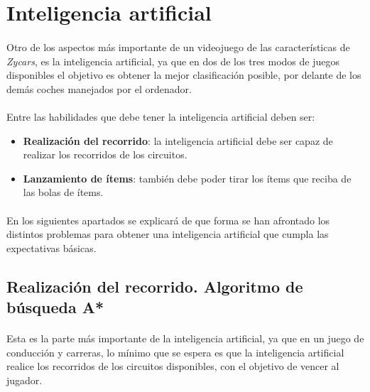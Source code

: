 \section{Inteligencia artificial}

\paragraph{}
Otro de los aspectos más importante de un videojuego de las características de \emph{Zycars}, es la inteligencia artificial,
ya que en dos de los tres modos de juegos disponibles el objetivo es obtener la mejor clasificación posible, por delante
de los demás coches manejados por el ordenador.

\paragraph{}
Entre las habilidades que debe tener la inteligencia artificial deben ser:

\begin{itemize}
    \item \textbf{Realización del recorrido}: la inteligencia artificial debe ser capaz de realizar los recorridos de los
    circuitos.
    
    \item \textbf{Lanzamiento de ítems}: también debe poder tirar los ítems que
    reciba de las bolas de ítems.
\end{itemize}

\paragraph{}
En los siguientes apartados se explicará de que forma se han afrontado los distintos problemas para obtener una inteligencia
artificial que cumpla las expectativas básicas.

\subsection{Realización del recorrido. Algoritmo de búsqueda A*}

\paragraph{}
Esta es la parte más importante de la inteligencia artificial, ya que en un juego de conducción y carreras, lo mínimo que se 
espera es que la inteligencia artificial realice los recorridos de los circuitos disponibles, con el objetivo de vencer al
jugador.

